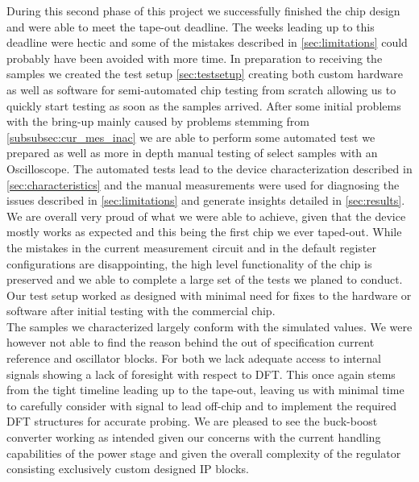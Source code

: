 During this second phase of this project we successfully finished the chip design and were able to meet the tape-out deadline. The weeks leading up to this deadline were hectic and some of the mistakes described in \autoref{sec:limitations} could probably have been avoided with more time. In preparation to receiving the samples we created the test setup \autoref{sec:testsetup} creating both custom hardware as well as software for semi-automated chip testing from scratch allowing us to quickly start testing as soon as the samples arrived. After some initial problems with the bring-up mainly caused by problems stemming from \autoref{subsubsec:cur_mes_inac} we are able to perform some automated test we prepared as well as more in depth manual testing of select samples with an Oscilloscope. The automated tests lead to the device characterization described in \autoref{sec:characteristics} and the manual measurements were used for diagnosing the issues described in \autoref{sec:limitations} and generate insights detailed in \autoref{sec:results}. \\

We are overall very proud of what we were able to achieve, given that the device mostly works as expected and this being the first chip we ever taped-out. While the mistakes in the current measurement circuit and in the default register configurations are disappointing, the high level functionality of the chip is preserved and we able to complete a large set of the tests we planed to conduct. Our test setup worked as designed with minimal need for fixes to the hardware or software after initial testing with the commercial chip. \\

The samples we characterized largely conform with the simulated values. We were however not able to find the reason behind the out of specification current reference and oscillator blocks. For both we lack adequate access to internal signals showing a lack of foresight with respect to \ac{DFT}. This once again stems from the tight timeline leading up to the tape-out, leaving us with minimal time to carefully consider with signal to lead off-chip and to implement the required \ac{DFT} structures for accurate probing. We are pleased to see the buck-boost converter working as intended given our concerns with the current handling capabilities of the power stage and given the overall complexity of the regulator consisting exclusively custom designed IP blocks.






\clearpage